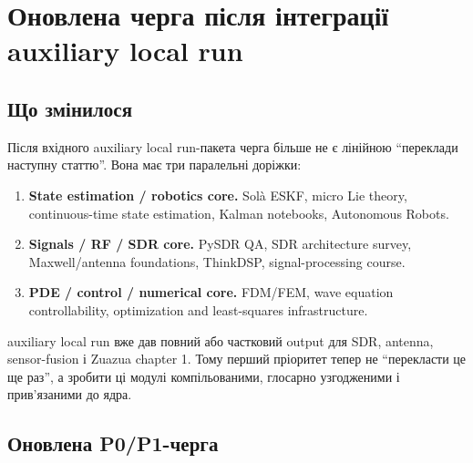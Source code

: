 \chapter{Оновлена черга після інтеграції auxiliary local run}
\label{ch:session04-queue}

\section{Що змінилося}

Після вхідного auxiliary local run-пакета черга більше не є лінійною ``переклади наступну статтю''. Вона має три паралельні доріжки:

\begin{enumerate}[label=\arabic*.]
\item \textbf{State estimation / robotics core.} Solà ESKF, micro Lie theory, continuous-time state estimation, Kalman notebooks, Autonomous Robots.
\item \textbf{Signals / RF / SDR core.} PySDR QA, SDR architecture survey, Maxwell/antenna foundations, ThinkDSP, signal-processing course.
\item \textbf{PDE / control / numerical core.} FDM/FEM, wave equation controllability, optimization and least-squares infrastructure.
\end{enumerate}

auxiliary local run вже дав повний або частковий output для SDR, antenna, sensor-fusion і Zuazua chapter 1. Тому перший пріоритет тепер не ``перекласти це ще раз'', а зробити ці модулі компільованими, глосарно узгодженими і прив'язаними до ядра.

\section{Оновлена P0/P1-черга}

